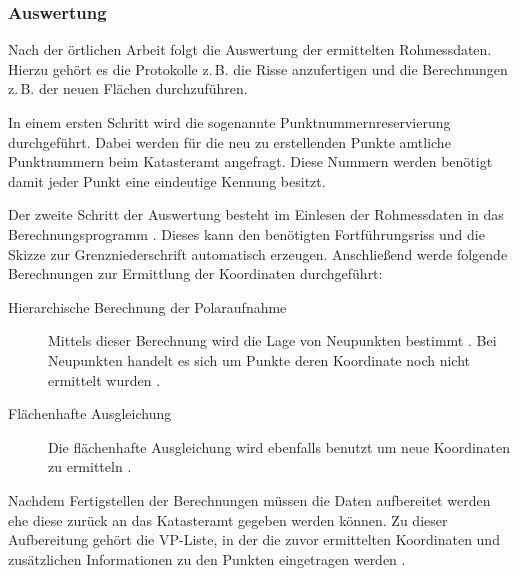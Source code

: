 
\subsubsection{Auswertung} \label{subsubsec:auswertung}

Nach der örtlichen Arbeit folgt die Auswertung der ermittelten Rohmessdaten. Hierzu gehört es die Protokolle z.\,B. die Risse anzufertigen und die Berechnungen z.\,B. der neuen Flächen durchzuführen. 

In einem ersten Schritt wird die sogenannte Punktnummernreservierung durchgeführt. Dabei werden für die neu zu erstellenden Punkte amtliche Punktnummern beim Katasteramt angefragt. Diese Nummern werden benötigt damit jeder Punkt eine eindeutige Kennung besitzt.

Der zweite Schritt der Auswertung besteht im Einlesen der Rohmessdaten in das Berechnungsprogramm . Dieses kann den benötigten Fortführungsriss und die Skizze zur Grenzniederschrift automatisch erzeugen.
Anschließend werde folgende Berechnungen zur Ermittlung der Koordinaten durchgeführt:
\begin{description}
	\item[Hierarchische Berechnung der Polaraufnahme] Mittels dieser Berechnung wird die Lage von Neupunkten bestimmt \autocite[vgl.][]{wiki-polaraufnahme}. Bei Neupunkten handelt es sich um Punkte deren Koordinate noch nicht ermittelt wurden \autocite[vgl.][]{wiki-neupunkt}.  
	\item[Flächenhafte Ausgleichung] Die flächenhafte Ausgleichung wird ebenfalls benutzt um neue Koordinaten zu ermitteln  \autocite[vgl.][6]{bezk-ausgleichung}.
\end{description}

Nachdem Fertigstellen der Berechnungen müssen die Daten aufbereitet werden ehe diese zurück an das Katasteramt gegeben werden können.
Zu dieser Aufbereitung gehört die \ac{VP-Liste}, in der die zuvor ermittelten Koordinaten und zusätzlichen Informationen zu den Punkten eingetragen werden \autocite[vgl.][62]{bezk-vp-liste}.

